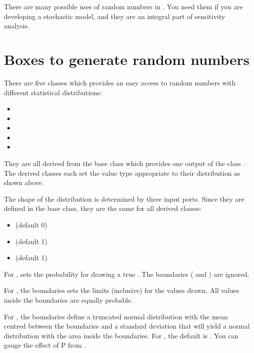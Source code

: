 There are many possible uses of random numbers in \US. You need them if you are developing a stochastic model, and they are an integral part of sensitivity analysis.

\section {Boxes to generate random numbers}
There are five  classes which provides an easy access to random numbers with different statistical distributions:
\begin{itemize}
\item {}
\item {}
\item {}
\item {}
\item {}
\end{itemize}
They are all derived from the  base class which provides one output  of the class . The derived classes each set the value type appropriate to their distribution as shown above.

The shape of the distribution is determined by three input ports. Since they are defined in the  base class, they are the same for all derived classes:
\begin{itemize}
\item {} (default 0)
\item {} (default 1)
\item {} (default 1)
\end{itemize}

For ,  sets the probability for drawing a true . The boundaries ( and ) are ignored.

For  , the boundaries sets the limits (inclusive) for the values drawn. All values inside the boundaries are equally probable.

For , the boundaries define a truncated normal distribution with the mean centred between the boundaries and a standard deviation that will yield a normal distribution with the area  inside the boundaries. For , the default is . You can gauge the effect of P from .

